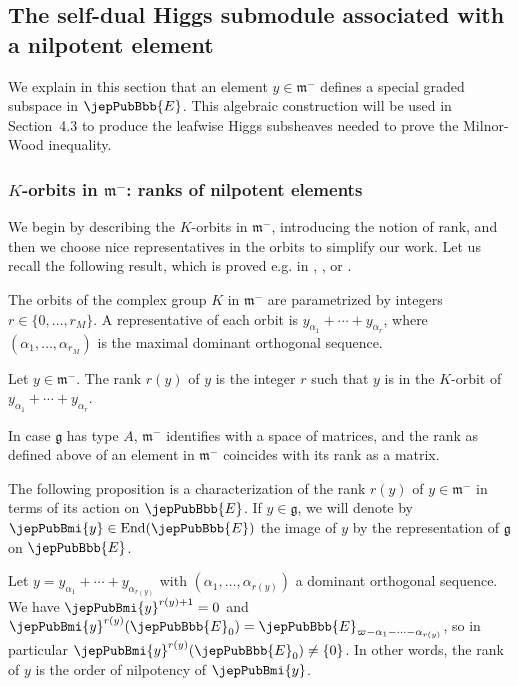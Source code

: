\subsection{The self-dual Higgs submodule associated with a nilpotent element}
We explain in this section that an element $y\in\mathfrak m^-$ defines a special graded subspace in $\jepPubBbb{E}$. This algebraic construction will be used in Section~4.3 to produce the leafwise Higgs subsheaves needed to prove the Milnor-Wood inequality.
\subsubsection{$K$-orbits in $\mathfrak m^-$: ranks of nilpotent elements}
We begin by describing the $K$-orbits in $\mathfrak m^-$, introducing the notion of rank, and then we choose nice representatives in the orbits to simplify our work. Let us recall the following result, which is proved e.g. in \cite{jep93HC56}, \cite[Ch.~VIII, \S7]{jep93Hel01}, or \cite{jep93Wol72}.
\begin{proposition}
The orbits of the complex group $K$ in $\mathfrak m^-$ are parametrized by integers $r\in\{0,\ldots,r_M\}$. A representative of each orbit is $y_{\alpha_1}+\cdots+y_{\alpha_r}$, where $(\alpha_1,\ldots,\alpha_{r_M})$ is the maximal dominant orthogonal sequence.
\end{proposition}
\begin{definition}
Let $y\in\mathfrak m^-$. The rank $r(y)$ of $y$ is the integer $r$ such that $y$ is in the $K$-orbit of $y_{\alpha_1}+\cdots+y_{\alpha_r}$.
\end{definition}
\begin{example}
In case $\mathfrak g$ has type $A$, $\mathfrak m^-$ identifies with a space of matrices, and the rank as defined above of an element in $\mathfrak m^-$ coincides with its rank as a matrix.
\end{example}
The following proposition is a characterization of the rank $r(y)$ of $y\in\mathfrak m^-$ in terms of its action on $\jepPubBbb{E}$. If $y\in\mathfrak g$, we will denote by $\jepPubBmi{y}\in\operatorname{End}(\jepPubBbb{E})$ the image of $y$ by the representation of $\mathfrak g$ on $\jepPubBbb{E}$.
\begin{proposition}
Let $y=y_{\alpha_1}+\cdots+y_{\alpha_{r(y)}}$ with $(\alpha_1,\ldots,\alpha_{r(y)})$ a dominant orthogonal sequence. We have $\jepPubBmi{y}^{r(y)+1}=0$ and $\jepPubBmi{y}^{r(y)}(\jepPubBbb{E}_0)=\jepPubBbb{E}_{\varpi-\alpha_1-\cdots-\alpha_{r(y)}}$, so in particular $\jepPubBmi{y}^{r(y)}(\jepPubBbb{E}_0)\neq\{0\}$. In other words, the rank of $y$ is the order of nilpotency of $\jepPubBmi{y}$.
\end{proposition}
